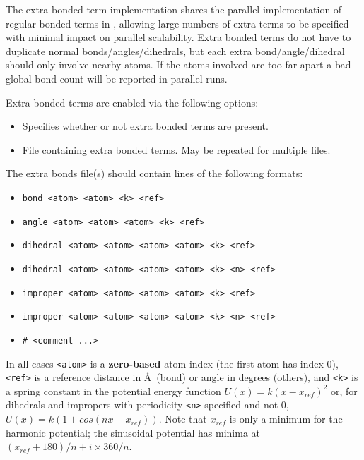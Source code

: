 The extra bonded term implementation shares the parallel implementation
of regular bonded terms in \NAMD, allowing large numbers of extra terms
to be specified with minimal impact on parallel scalability.
Extra bonded terms do not have to duplicate normal bonds/angles/dihedrals,
but each extra bond/angle/dihedral should only involve nearby atoms.
If the atoms involved are too far apart a bad global bond count will be
reported in parallel runs.

Extra bonded terms are enabled via the following options:

\begin{itemize}

\item
{}
{Specifies whether or not extra bonded terms are present.} 

\item
{}
{File containing extra bonded terms.  May be repeated for multiple files.} 

\end{itemize}

The extra bonds file(s) should contain lines of the following formats:

\begin{itemize}
\item
{\tt bond <atom> <atom> <k> <ref>}
\item
{\tt angle <atom> <atom> <atom> <k> <ref>}
\item
{\tt dihedral <atom> <atom> <atom> <atom> <k> <ref>}
\item
{\tt dihedral <atom> <atom> <atom> <atom> <k> <n> <ref>}
\item
{\tt improper <atom> <atom> <atom> <atom> <k> <ref>}
\item
{\tt improper <atom> <atom> <atom> <atom> <k> <n> <ref>}
\item
{\tt \# <comment ...>}
\end{itemize}

In all cases {\tt <atom>} is a {\bf zero-based} atom index
(the first atom has index 0),
{\tt <ref>} is a reference distance in \AA\ (bond) or angle in degrees (others),
and {\tt <k>} is a spring constant in the potential energy function
$U(x) = k (x-x_{ref})^2$ or, for dihedrals and impropers with 
periodicity {\tt <n>} specified and not 0, $U(x) = k (1 + cos(n x - x_{ref}))$.
Note that $x_{ref}$ is only a minimum for the harmonic potential;
the sinusoidal potential has minima at $(x_{ref} + 180)/n + i \times 360/n$.


